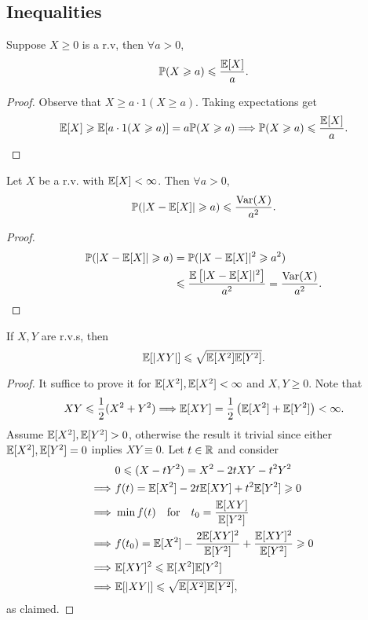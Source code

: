 \subsection{Inequalities}
\begin{proposition}\label{prop:Markov's inequality}
    Suppose $ X\ge 0 $ is a r.v, then $ \forall a>0 $, 
    \[
        \mathbb{P}(X\geqslant a) \leqslant \frac{{\mathbb{E}}[X]}{a}.
    \]
\end{proposition}
\begin{proof}
    Observe that $ X\ge a \cdot 1(X\ge a) $. Taking expectations get 
    \[
        {\mathbb{E}}[X]\geqslant {\mathbb{E}}[a \cdot 1(X\geqslant a)] = a \mathbb{P}(X\geqslant a) \Longrightarrow \mathbb{P}(X\geqslant a)\leqslant \frac{{\mathbb{E}}[X]}{a}.\qedhere
    \]
\end{proof}
\begin{proposition}\label{prop:Chebyshev's inequality}
    Let $X$ be a r.v. with $ {\mathbb{E}}[X]<\infty  $. Then $ \forall a>0 $,
    \[
        \mathbb{P}(|X-{\mathbb{E}}[X]|\geqslant a)\leqslant \frac{\operatorname{Var}(X)}{a^2}.
    \]
\end{proposition}
\begin{proof}
    \begin{align*}
        \mathbb{P}(|X-{\mathbb{E}}[X]|\geqslant a) &= \mathbb{P}(|X-{\mathbb{E}}[X]|^2\geqslant a^2)\\ 
        &\leqslant \frac{{\mathbb{E}}\left[ |X-{\mathbb{E}}[X]|^2 \right]}{a^2} = \frac{\operatorname{Var}(X)}{a^2}.\qedhere
    \end{align*}
\end{proof}

\begin{proposition}\label{prop:Cauchy-Schwartz inequality}
    If $X,Y$ are r.v.s, then 
    \[
        {\mathbb{E}}[|XY|]\leqslant \sqrt{{\mathbb{E}}[X^2]{\mathbb{E}}[Y^2]}.
    \]
\end{proposition}
\begin{proof}
    It suffice to prove it for $ {\mathbb{E}}[X^2],{\mathbb{E}}[X^2]<\infty $ and $ X,Y\ge 0 $. Note that 
    \[
        XY\leqslant \frac{1}{2}(X^2+Y^2) \Longrightarrow {\mathbb{E}}[XY] = \frac{1}{2}\left( {\mathbb{E}}[X^2]+{\mathbb{E}}[Y^2] \right)<\infty .
    \]
    Assume $ {\mathbb{E}}[X^2],{\mathbb{E}}[Y^2]>0 $, otherwise the result it trivial since either $ {\mathbb{E}}[X^2],{\mathbb{E}}[Y^2]=0 $ inplies $XY\equiv 0$. Let $t\in {\mathbb{R}}$ and consider 
    \begin{align*}
        &\ 0\leqslant (X-tY^2) = X^2-2tXY-t^2Y^2\\ 
        \Longrightarrow &\  f(t) = {\mathbb{E}}[X^2]-2t{\mathbb{E}}[XY]+t^2{\mathbb{E}}[Y^2]\geqslant 0\\ 
        \Longrightarrow &\  \min f(t)\quad\text{for}\quad t_0 = \frac{{\mathbb{E}}[XY]}{{\mathbb{E}}[Y^2]} \\ 
        \Longrightarrow &\  f(t_0)={\mathbb{E}}[X^2]-\frac{2{\mathbb{E}}[XY]^2}{{\mathbb{E}}[Y^2]}+\frac{{\mathbb{E}}[XY]^2}{{\mathbb{E}}[Y^2]}\geqslant 0\\ 
        \Longrightarrow &\  {\mathbb{E}}[XY]^2\leqslant {\mathbb{E}}[X^2]{\mathbb{E}}[Y^2]\\ 
        \Longrightarrow &\  {\mathbb{E}}[|XY|]\leqslant \sqrt{{\mathbb{E}}[X^2]{\mathbb{E}}[Y^2]},
    \end{align*}
    as claimed.
\end{proof}
